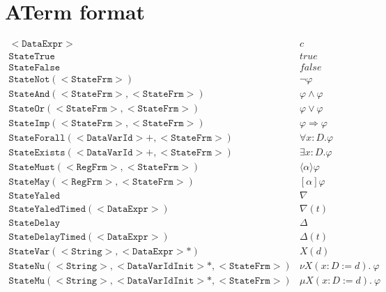 \documentclass{article}
\begin{document}
\section{ATerm format}
\[
\begin{array}{ll}
\mathtt{<DataExpr>                                        } & c                              \\
\mathtt{StateTrue                                         } & true                           \\
\mathtt{StateFalse                                        } & false                          \\
\mathtt{StateNot(<StateFrm>)                              } & \neg \varphi                   \\
\mathtt{StateAnd(<StateFrm>, <StateFrm>)                  } & \varphi \wedge \varphi         \\
\mathtt{StateOr(<StateFrm>, <StateFrm>)                   } & \varphi \vee \varphi           \\
\mathtt{StateImp(<StateFrm>, <StateFrm>)                  } & \varphi \Rightarrow \varphi    \\
\mathtt{StateForall(<DataVarId>+, <StateFrm>)             } & \forall x{:}D .\varphi         \\
\mathtt{StateExists(<DataVarId>+, <StateFrm>)             } & \exists x{:}D .\varphi         \\
\mathtt{StateMust(<RegFrm>, <StateFrm>)                   } & \langle\alpha\rangle \varphi   \\
\mathtt{StateMay(<RegFrm>, <StateFrm>)                    } & [\alpha] \varphi               \\
\mathtt{StateYaled                                        } & \nabla                         \\
\mathtt{StateYaledTimed(<DataExpr>)                       } & \nabla(t)                      \\
\mathtt{StateDelay                                        } & \Delta                         \\
\mathtt{StateDelayTimed(<DataExpr>)                       } & \Delta(t)                      \\
\mathtt{StateVar(<String>, <DataExpr>\ast)                } & X(d)                           \\
\mathtt{StateNu(<String>, <DataVarIdInit>\ast, <StateFrm>)} & \nu  X(x{:}D:=d).~\varphi      \\
\mathtt{StateMu(<String>, <DataVarIdInit>\ast, <StateFrm>)} & \mu  X(x{:}D:=d).~\varphi
\end{array}
\]
\end{document}
